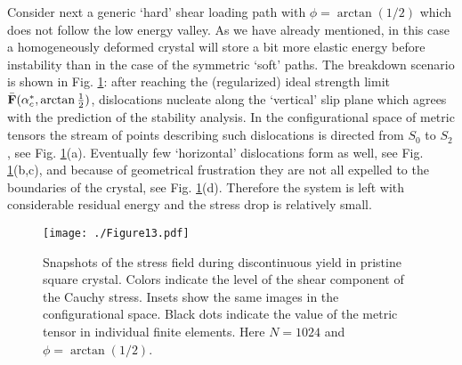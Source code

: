 \documentclass[CRPHYS,Unicode,manuscript]{cedram}
\begin{document}
Consider next  a generic  `hard'   shear loading path with  $\phi=\arctan( 1/2)$ which  does not follow the low energy  valley.    As we have already mentioned, in this case a homogeneously deformed crystal will  store  a bit more  elastic energy before  instability than in the case of the symmetric   `soft' paths. The  breakdown scenario is shown in  Fig. \ref{fig:th26}: after reaching the (regularized) ideal strength limit  $ \bar{\bf F}(\alpha_c^*,\arctan{\frac{1}{2}})$, dislocations nucleate along the `vertical' slip plane  which  agrees with the prediction of the stability analysis.  In the configurational space of metric tensors the stream of points describing such dislocations is directed  from  $S_0$ to  $S_{2}$, see Fig. \ref{fig:th26}(a). Eventually few `horizontal' dislocations form as well, see Fig. \ref{fig:th26}(b,c), and because of geometrical frustration  they are not all expelled to the boundaries of the crystal, see Fig. \ref{fig:th26}(d). Therefore the system is left with considerable residual energy and the stress drop is relatively small.
  
\begin{figure}[h!]
\centering
\texttt{[image: ./Figure13.pdf]}
\caption{\scriptsize {Snapshots of the stress field during discontinuous yield in pristine square crystal. Colors indicate the level of the shear component of the Cauchy stress. Insets show the same images in the configurational space. Black dots indicate the value of the metric tensor in individual finite elements.
Here $N=1024$ and $\phi=\arctan( 1/2)$.  }
 \label{fig:th26}}
\end{figure}
 
\end{document}
